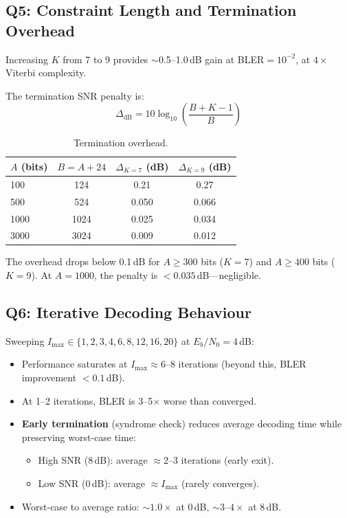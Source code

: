 \documentclass[12pt, a4paper]{article}
\begin{document}
\subsection{Q5: Constraint Length and Termination Overhead}
Increasing $K$ from 7 to 9 provides $\sim$0.5--1.0\,dB gain at BLER$=10^{-2}$, at $4\times$ Viterbi complexity.

The termination SNR penalty is:
\begin{equation}
\Delta_{\text{dB}} = 10\log_{10}\!\left(\frac{B+K-1}{B}\right)
\end{equation}

\begin{table}[H]
\centering
\caption{Termination overhead.}
\begin{tabular}{@{}lccc@{}}
\toprule
$A$ (bits) & $B=A+24$ & $\Delta_{K=7}$ (dB) & $\Delta_{K=9}$ (dB) \\
\midrule
100  & 124  & 0.21 & 0.27 \\
500  & 524  & 0.050 & 0.066 \\
1000 & 1024 & 0.025 & 0.034 \\
3000 & 3024 & 0.009 & 0.012 \\
\bottomrule
\end{tabular}
\end{table}

The overhead drops below 0.1\,dB for $A\geq300$ bits ($K=7$) and $A\geq400$ bits ($K=9$). At $A=1000$, the penalty is $<0.035$\,dB---negligible.

\subsection{Q6: Iterative Decoding Behaviour}
Sweeping $I_{\max}\in\{1,2,3,4,6,8,12,16,20\}$ at $E_b/N_0=4$\,dB:
\begin{itemize}[nosep]
    \item Performance saturates at $I_{\max}\approx 6$--8 iterations (beyond this, BLER improvement $<0.1$\,dB).
    \item At 1--2 iterations, BLER is 3--5$\times$ worse than converged.
    \item \textbf{Early termination} (syndrome check) reduces average decoding time while preserving worst-case time:
    \begin{itemize}[nosep]
        \item High SNR (8\,dB): average $\approx$2--3 iterations (early exit).
        \item Low SNR (0\,dB): average $\approx I_{\max}$ (rarely converges).
    \end{itemize}
    \item Worst-case to average ratio: $\sim1.0\times$ at 0\,dB, $\sim3$--$4\times$ at 8\,dB.
\end{itemize}
\end{document}
